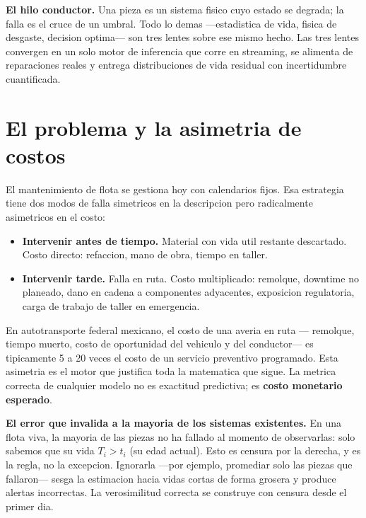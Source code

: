 \documentclass[11pt,a4paper]{article}
\begin{document}
\vspace{2.5cm}

\begin{concepto}
\textbf{El hilo conductor.}
Una pieza es un sistema fisico cuyo estado se degrada; la falla es el cruce
de un umbral. Todo lo demas ---estadistica de vida, fisica de desgaste,
decision optima--- son tres lentes sobre ese mismo hecho. Las tres lentes
convergen en un solo motor de inferencia que corre en streaming, se alimenta
de reparaciones reales y entrega distribuciones de vida residual con
incertidumbre cuantificada.
\end{concepto}

\newpage

\section{El problema y la asimetria de costos}

El mantenimiento de flota se gestiona hoy con calendarios fijos. Esa
estrategia tiene dos modos de falla simetricos en la descripcion pero
radicalmente asimetricos en el costo:

\begin{itemize}
  \item \textbf{Intervenir antes de tiempo.} Material con vida util restante
    descartado. Costo directo: refaccion, mano de obra, tiempo en taller.
  \item \textbf{Intervenir tarde.} Falla en ruta. Costo multiplicado:
    remolque, downtime no planeado, dano en cadena a componentes adyacentes,
    exposicion regulatoria, carga de trabajo de taller en emergencia.
\end{itemize}

En autotransporte federal mexicano, el costo de una averia en ruta ---
remolque, tiempo muerto, costo de oportunidad del vehiculo y del conductor---
es tipicamente 5 a 20 veces el costo de un servicio preventivo programado.
Esta asimetria es el motor que justifica toda la matematica que sigue.
La metrica correcta de cualquier modelo no es exactitud predictiva;
es \textbf{costo monetario esperado}.

\begin{critico}
\textbf{El error que invalida a la mayoria de los sistemas existentes.}
En una flota viva, la mayoria de las piezas no ha fallado al momento de
observarlas: solo sabemos que su vida $T_i > t_i$ (su edad actual). Esto
es censura por la derecha, y es la regla, no la excepcion. Ignorarla
---por ejemplo, promediar solo las piezas que fallaron--- sesga la
estimacion hacia vidas cortas de forma grosera y produce alertas incorrectas.
La verosimilitud correcta se construye con censura desde el primer dia.
\end{critico}
\end{document}
